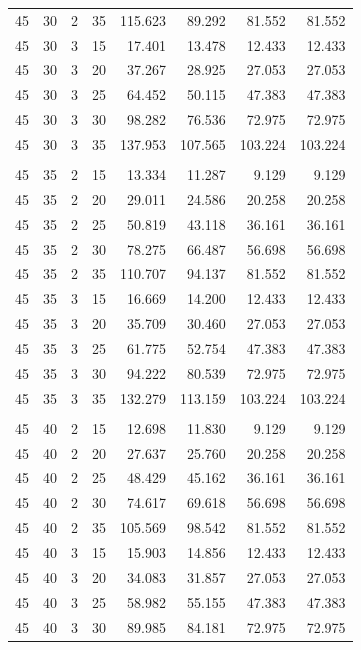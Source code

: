 \documentclass{article}
\begin{document}
\begin{longtable}{rrrrrrrr}
45 & 30 & 2 & 35 & 115.623 & 89.292 & 81.552 & 81.552 \\
45 & 30 & 3 & 15 & 17.401 & 13.478 & 12.433 & 12.433 \\
45 & 30 & 3 & 20 & 37.267 & 28.925 & 27.053 & 27.053 \\
45 & 30 & 3 & 25 & 64.452 & 50.115 & 47.383 & 47.383 \\
45 & 30 & 3 & 30 & 98.282 & 76.536 & 72.975 & 72.975 \\
45 & 30 & 3 & 35 & 137.953 & 107.565 & 103.224 & 103.224 \\
\addlinespace
\multicolumn{8}{l}{\textbf{$\theta_1=45^\circ$, $\theta_2=35^\circ$}} \\
45 & 35 & 2 & 15 & 13.334 & 11.287 & 9.129 & 9.129 \\
45 & 35 & 2 & 20 & 29.011 & 24.586 & 20.258 & 20.258 \\
45 & 35 & 2 & 25 & 50.819 & 43.118 & 36.161 & 36.161 \\
45 & 35 & 2 & 30 & 78.275 & 66.487 & 56.698 & 56.698 \\
45 & 35 & 2 & 35 & 110.707 & 94.137 & 81.552 & 81.552 \\
45 & 35 & 3 & 15 & 16.669 & 14.200 & 12.433 & 12.433 \\
45 & 35 & 3 & 20 & 35.709 & 30.460 & 27.053 & 27.053 \\
45 & 35 & 3 & 25 & 61.775 & 52.754 & 47.383 & 47.383 \\
45 & 35 & 3 & 30 & 94.222 & 80.539 & 72.975 & 72.975 \\
45 & 35 & 3 & 35 & 132.279 & 113.159 & 103.224 & 103.224 \\
\addlinespace
\multicolumn{8}{l}{\textbf{$\theta_1=45^\circ$, $\theta_2=40^\circ$}} \\
45 & 40 & 2 & 15 & 12.698 & 11.830 & 9.129 & 9.129 \\
45 & 40 & 2 & 20 & 27.637 & 25.760 & 20.258 & 20.258 \\
45 & 40 & 2 & 25 & 48.429 & 45.162 & 36.161 & 36.161 \\
45 & 40 & 2 & 30 & 74.617 & 69.618 & 56.698 & 56.698 \\
45 & 40 & 2 & 35 & 105.569 & 98.542 & 81.552 & 81.552 \\
45 & 40 & 3 & 15 & 15.903 & 14.856 & 12.433 & 12.433 \\
45 & 40 & 3 & 20 & 34.083 & 31.857 & 27.053 & 27.053 \\
45 & 40 & 3 & 25 & 58.982 & 55.155 & 47.383 & 47.383 \\
45 & 40 & 3 & 30 & 89.985 & 84.181 & 72.975 & 72.975 \\

\end{longtable}
\end{document}
